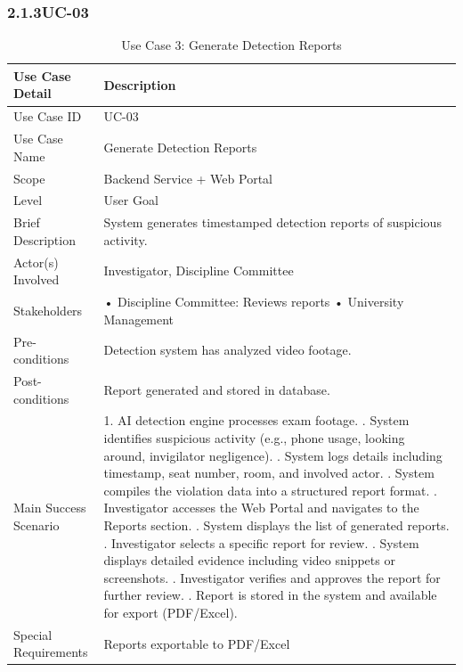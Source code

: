 \clearpage

\subsubsection*{2.1.3\quad UC-03}
\begin{longtable}{|p{5cm}|p{10cm}|}
\caption{Use Case 3: Generate Detection Reports}\label{uc1} \\
\hline
\textbf{Use Case Detail} & \textbf{Description} \\ \hline
Use Case ID & UC-03 \\ \hline
Use Case Name & Generate Detection Reports \\ \hline
Scope & Backend Service + Web Portal \\ \hline
Level & User Goal \\ \hline
Brief Description & System generates timestamped detection reports of suspicious activity. \\ \hline
Actor(s) Involved & Investigator, Discipline Committee \\ \hline
Stakeholders & • Discipline Committee: Reviews reports \newline • University Management \\ \hline
Pre-conditions & Detection system has analyzed video footage. \\ \hline
Post-conditions & Report generated and stored in database. \\ \hline
Main Success Scenario & 
1. AI detection engine processes exam footage. \newline
2. System identifies suspicious activity (e.g., phone usage, looking around, invigilator negligence). \newline
3. System logs details including timestamp, seat number, room, and involved actor. \newline
4. System compiles the violation data into a structured report format. \newline
5. Investigator accesses the Web Portal and navigates to the Reports section. \newline
6. System displays the list of generated reports. \newline
7. Investigator selects a specific report for review. \newline
8. System displays detailed evidence including video snippets or screenshots. \newline
9. Investigator verifies and approves the report for further review. \newline
10. Report is stored in the system and available for export (PDF/Excel). \\ \hline

Special Requirements & Reports exportable to PDF/Excel \\ \hline

\end{longtable}

